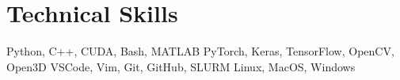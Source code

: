 \section{Technical Skills}

\setlength{\multicolsep}{-4pt}
\begin{multicols}{2}
    \raggedcolumns

    \resumeSubHeadingListStart
    {Python, C++, CUDA, Bash, MATLAB}
    {PyTorch, Keras, TensorFlow, OpenCV, Open3D}
    {VSCode, Vim, Git, GitHub, SLURM}
    {Linux, MacOS, Windows}
    \resumeSubHeadingListEnd

\end{multicols}

